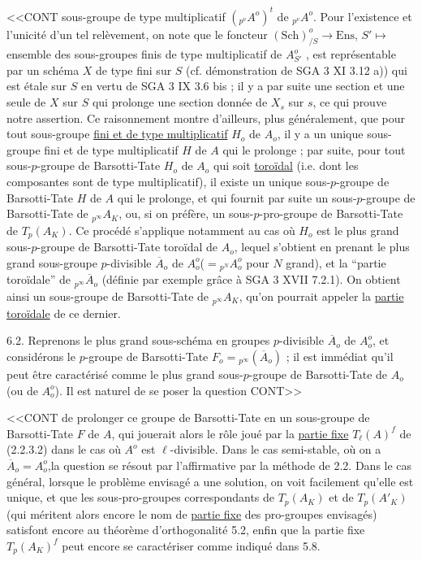<<CONT sous-groupe de type multiplicatif $({}_{p^\nu}A^o)^t$ de ${}_{p^\nu}A^o$. Pour l'existence et l'unicité d'un tel relèvement, on note que le foncteur $(\mathrm{Sch})^o_{/S} \longrightarrow \mathrm{Ens}$, $S' \longmapsto$ ensemble des sous-groupes finis de type multiplicatif de $A^o_{S'}$ , est représentable par un schéma $X$ de type fini sur $S$ (cf. démonstration de SGA 3 XI 3.12 a)) qui est étale sur $S$ en vertu de SGA 3 IX 3.6 bis ; il y a par suite une section et une seule de $X$ sur $S$ qui prolonge une section donnée de $X_s$ sur $s$, ce qui prouve notre assertion. Ce raisonnement montre d'ailleurs, plus généralement, que pour tout sous-groupe \underline{fini et de type multiplicatif} $H_o$ de $A_o$, il y a un unique sous-groupe fini et de type multiplicatif $H$ de $A$ qui le prolonge ; par suite, pour tout sous-$p$-groupe de Barsotti-Tate $H_o$ de $A_o$ qui soit \underline{toroïdal} (i.e. dont les composantes sont de type multiplicatif), il existe un unique sous-$p$-groupe de Barsotti-Tate $H$ de $A$ qui le prolonge, et qui fournit par suite un sous-$p$-groupe de Barsotti-Tate de ${}_{p^\infty}A_K$, ou, si on préfère, un sous-$p$-pro-groupe de Barsotti-Tate de $T_p(A_K)$. Ce procédé s'applique notamment au cas où $H_o$ est le plus grand sous-$p$-groupe de Barsotti-Tate toroïdal de $A_o$, lequel s'obtient en prenant le plus grand sous-groupe $p$-divisible $\overline{A}_o$ de $A_o^o$($= {}_{p^N}A_o^o$ pour $N$ grand), et la ``partie toroïdale'' de ${}_{p^\infty}\overline{A}_o$ (définie par exemple grâce à SGA 3 XVII 7.2.1). On obtient ainsi un sous-groupe de Barsotti-Tate de ${}_{p^{\overline{\infty}}}A_K$, qu'on pourrait appeler la \underline{partie toroïdale} de ce dernier.

6.2. Reprenons le plus grand sous-schéma en groupes $p$-divisible $\overline{A}_o$ de $A_o^o$, et considérons le $p$-groupe de Barsotti-Tate $F_o = {}_{p^\infty}(\overline{A}_o)$ ; il est immédiat qu'il peut être caractérisé comme le plus grand sous-$p$-groupe de Barsotti-Tate de $A_o$ (ou de $A_o^o$). Il est naturel de se poser la question CONT>>



<<CONT de prolonger ce groupe de Barsotti-Tate en un sous-groupe de Barsotti-Tate $F$ de $A$, qui jouerait alors le rôle joué par la \underline{partie fixe} $T_\ell(A)^f$ de (2.2.3.2) dans le cas où $A^o$ est $\ell$-divisible. Dans le cas semi-stable, où on a $\overline{A}_o = A_o^o$,la question se résout par l'affirmative par la méthode de 2.2. Dans le cas général, lorsque le problème envisagé a une solution, on voit facilement qu'elle est unique, et que les sous-pro-groupes correspondants de $T_p(A_K)$ et de $T_p(A'_K)$ (qui méritent alors encore le nom de \underline{partie fixe} des pro-groupes envisagés) satisfont encore au théorème d'orthogonalité 5.2, enfin que la partie fixe $T_p(A_K)^f$ peut encore se caractériser comme indiqué dans 5.8.

